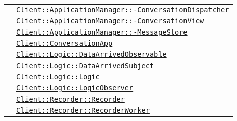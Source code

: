 \begin{longtable}{|>{\centering}m{3cm}|m{10cm}<{\centering}|}
& \hyperref[Client::ApplicationManager::ConversationDispatcher]{\texttt{Client::ApplicationManager::-\linebreak ConversationDispatcher}}\\
& \hyperref[Client::ApplicationManager::ConversationView]{\texttt{Client::ApplicationManager::-\linebreak ConversationView}}\\
& \hyperref[Client::ApplicationManager::MessageStore]{\texttt{Client::ApplicationManager::-\linebreak MessageStore}}\\
& \hyperref[Client::ConversationApp]{\texttt{Client::ConversationApp}}\\
& \hyperref[Client::Logic::DataArrivedObservable]{\texttt{Client::Logic::DataArrivedObservable}}\\
& \hyperref[Client::Logic::DataArrivedSubject]{\texttt{Client::Logic::DataArrivedSubject}}\\
& \hyperref[Client::Logic::Logic]{\texttt{Client::Logic::Logic}}\\
& \hyperref[Client::Logic::LogicObserver]{\texttt{Client::Logic::LogicObserver}}\\
& \hyperref[Client::Recorder::Recorder]{\texttt{Client::Recorder::Recorder}}\\
& \hyperref[Client::Recorder::RecorderWorker]{\texttt{Client::Recorder::RecorderWorker}}\\ \hline


\end{longtable}
